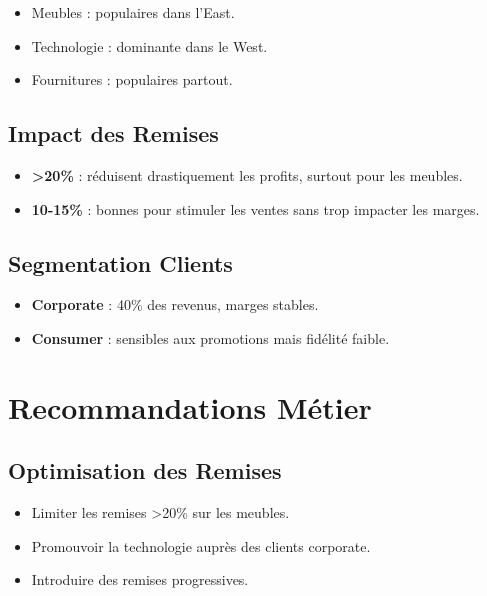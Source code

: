 \documentclass[
]{article}
\providecommand{\tightlist}{%
  \setlength{\itemsep}{0pt}\setlength{\parskip}{0pt}}
\begin{document}
\begin{itemize}
\tightlist
\item
  Meubles : populaires dans l'East.
\item
  Technologie : dominante dans le West.
\item
  Fournitures : populaires partout.
\end{itemize}

\subsection{Impact des Remises}\label{impact-des-remises}

\begin{itemize}
\tightlist
\item
  \textbf{\textgreater20\%} : réduisent drastiquement les profits,
  surtout pour les meubles.
\item
  \textbf{10-15\%} : bonnes pour stimuler les ventes sans trop impacter
  les marges.
\end{itemize}

\subsection{Segmentation Clients}\label{segmentation-clients}

\begin{itemize}
\tightlist
\item
  \textbf{Corporate} : 40\% des revenus, marges stables.
\item
  \textbf{Consumer} : sensibles aux promotions mais fidélité faible.
\end{itemize}

\section{Recommandations Métier}\label{recommandations-muxe9tier}

\subsection{Optimisation des Remises}\label{optimisation-des-remises}

\begin{itemize}
\tightlist
\item
  Limiter les remises \textgreater20\% sur les meubles.
\item
  Promouvoir la technologie auprès des clients corporate.
\item
  Introduire des remises progressives.
\end{itemize}
\end{document}
